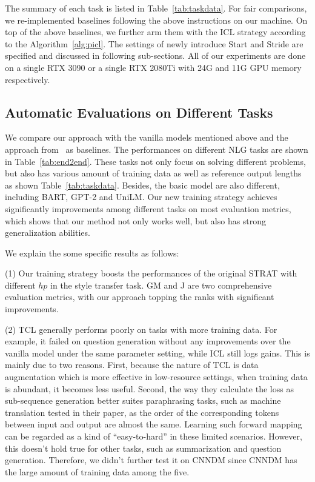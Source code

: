 The summary of each task is listed in Table~\ref{tab:taskdata}. For fair comparisons, we re-implemented baselines following the above instructions on our machine. On top of the above baselines, we further arm them with the ICL strategy according to the Algorithm~\ref{alg:picl}. The settings of newly introduce Start and Stride are specified and discussed in following sub-sections. All of our experiments are done on a single RTX 3090 or a single RTX 2080Ti with 24G and 11G GPU memory respectively.


 
\subsection{Automatic Evaluations on Different Tasks}
\label{sec:taskperformances}

We compare our approach with the vanilla models mentioned above and the approach from~\citet{liang-etal-2021-token-wise} as baselines.
The performances on different NLG tasks are shown in Table~\ref{tab:end2end}. 
These tasks not only focus on solving different problems, but also has various amount of training data as well
as reference output lengths as shown
Table~\ref{tab:taskdata}.
Besides, the basic model are also different, including BART, GPT-2 and UniLM. 
Our new training strategy achieves significantly improvements among different tasks on most evaluation metrics, which shows that our method not only works well, but also has strong generalization abilities.

We explain the some specific results as follows:

(1) Our training strategy boosts the performances of the original STRAT with different $hp$ in the style transfer task. GM and J are two comprehensive evaluation metrics, with our approach topping the ranks with significant improvements.

(2) TCL generally performs poorly on tasks
with more training data. For example, it failed on question generation without any improvements over the vanilla model under the same parameter setting, while ICL still 
logs gains. This is mainly due to two reasons.
First, because the nature of TCL is data augmentation which is more effective in low-resource settings,
when training data is abundant, it becomes less useful. 
Second, the way they calculate the loss as sub-sequence generation better suites paraphrasing tasks, such as machine translation tested in their paper, as the order of 
the corresponding tokens between input and output 
are almost the same. Learning such forward mapping can 
be regarded as a kind of ``easy-to-hard'' 
in these limited scenarios.
However, this doesn't hold true for other tasks, 
such as summarization and question generation. 
Therefore, we didn't further test it on CNNDM since
CNNDM has the large amount of training data among
the five.

